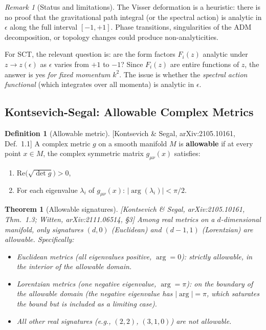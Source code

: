 \documentclass[12pt,a4paper]{article}
\newtheorem{theorem}[proposition]{Theorem}
\theoremstyle{definition}
\newtheorem{definition}[proposition]{Definition}
\theoremstyle{remark}
\newtheorem{remark}[proposition]{Remark}
\newcommand{\fromlit}[1]{\textcolor{blue!70!black}{\textsf{[#1]}}}
\begin{document}
\begin{remark}[Status and limitations]
The Visser deformation is a heuristic: there is no proof that the
gravitational path integral (or the spectral action) is analytic in
$\epsilon$ along the full interval $[-1, +1]$.  Phase transitions,
singularities of the ADM decomposition, or topology changes could
produce non-analyticities.

For SCT, the relevant question is: are the form factors $F_i(z)$
analytic under $z \to z(\epsilon)$ as $\epsilon$ varies from $+1$ to
$-1$?  Since $F_i(z)$ are entire functions of $z$, the answer is yes
\emph{for fixed momentum} $k^2$.  The issue is whether the
\emph{spectral action functional} (which integrates over all momenta)
is analytic in $\epsilon$.
\end{remark}


\subsection{Kontsevich-Segal: Allowable Complex Metrics}

\begin{definition}[Allowable metric]
\label{def:allowable}
\fromlit{Kontsevich \& Segal, arXiv:2105.10161, Def.~1.1}
A complex metric $g$ on a smooth manifold $M$ is \textbf{allowable} if
at every point $x \in M$, the complex symmetric matrix
$g_{\mu\nu}(x)$ satisfies:
\begin{enumerate}[nosep,label=(\roman*)]
  \item $\mathrm{Re}\bigl(\sqrt{\det g}\bigr) > 0$,
  \item For each eigenvalue $\lambda_i$ of $g_{\mu\nu}(x)$:
    $|\arg(\lambda_i)| < \pi/2$.
\end{enumerate}
\end{definition}

\begin{theorem}[Allowable signatures]
\label{thm:ks-signatures}
\fromlit{Kontsevich \& Segal, arXiv:2105.10161, Thm.~1.3;
Witten, arXiv:2111.06514, \S3}
Among \emph{real} metrics on a $d$-dimensional manifold, only
signatures $(d, 0)$ (Euclidean) and $(d-1, 1)$ (Lorentzian) are
allowable.  Specifically:
\begin{itemize}[nosep]
  \item Euclidean metrics (all eigenvalues positive, $\arg = 0$):
    strictly allowable, in the interior of the allowable domain.
  \item Lorentzian metrics (one negative eigenvalue, $\arg = \pi$):
    on the \emph{boundary} of the allowable domain (the negative
    eigenvalue has $|\arg| = \pi$, which saturates the bound but is
    included as a limiting case).
  \item All other real signatures (e.g., $(2,2)$, $(3,1,0)$) are
    \emph{not} allowable.
\end{itemize}
\end{theorem}
\end{document}
